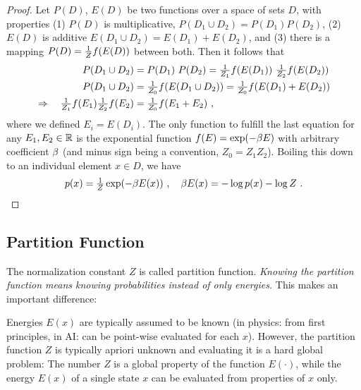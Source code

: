 {\small

\begin{proof}
Let $P(D)$, $E(D)$ be two functions over a space of sets $D$, with 
properties (1) $P(D)$ is multiplicative, $P(D_1 \cup D_2) = P(D_1)
P(D_2)$, (2) $E(D)$ is additive $E(D_1\cup D_2) = E(D_1) + E(D_2)$,
and (3) there is a mapping $P(D) = \textstyle\frac 1Z f(E(D))$ between both. Then it follows that
\begin{align}
P(D_1\cup D_2)
&= P(D_1)~ P(D_2) = \textstyle\frac 1{Z_1} f(E(D_1))~ \textstyle\frac 1{Z_2} f(E(D_2)) \\
P(D_1\cup D_2)
&= \textstyle\frac 1{Z_0} f(E(D_1\cup D_2)) = \textstyle\frac 1{Z_0} f(E(D_1) + E(D_2)) \\
\Rightarrow\quad \textstyle\frac 1{Z_1} f(E_1) \textstyle\frac 1{Z_2} f(E_2)
&= \textstyle\frac 1{Z_0} f(E_1+E_2) ~, \label{exp}
\end{align}
where we defined $E_i=E(D_i)$. The only function to fulfill
the last equation for any $E_1,E_2\in{\mathbb{R}}$ is the exponential function $f(E) = \exp( -\beta E )$ with arbitrary
 coefficient $\beta$ (and minus sign being a convention, $Z_0 = Z_1
 Z_2$). Boiling this down to an individual element $x\in D$, we have
\begin{align}
p(x) = \textstyle\frac 1Z \exp(-\beta E(x)) ~,\quad \beta E(x) = -\log p(x) - \log Z ~.
\end{align}
\end{proof}

}


\subsection{Partition Function}

The normalization constant $Z$ is called partition function. 
\emph{Knowing the partition function means knowing probabilities instead of only energies.} This makes an important difference:

Energies $E(x)$ are typically assumed to be known (in physics: from
first principles, in AI: can be point-wise evaluated for each
$x$). However, the partition function $Z$ is typically apriori unknown
and evaluating it is a hard global problem: The number $Z$ is a global
property of the function $E(\cdot)$, while the energy $E(x)$ of a
single state $x$ can be evaluated from properties of $x$
only.

